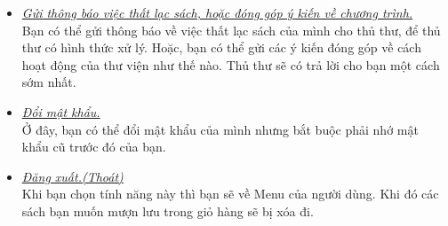 \documentclass[16pt,a4paper,oneside]{article}
\begin{document}
\begin{itemize}
	\item \underline{\textit{Gửi thông báo việc thất lạc sách, hoặc đóng góp ý kiến về chương trình.}}\\
	Bạn có thể gửi thông báo về việc thất lạc sách của mình cho thủ thư, để thủ thư có hình thức xử lý. Hoặc, bạn có thể gửi các ý kiến đóng góp về cách hoạt động của thư viện như thế nào. Thủ thư sẽ có trả lời cho bạn một cách sớm nhất.
	\item \underline{\textit{Đổi mật khẩu.}}\\
	Ở đây, bạn có thể đổi mật khẩu của mình nhưng bắt buộc phải nhớ mật khẩu cũ trước đó của bạn.
	\item \underline{\textit{Đăng xuất.(Thoát)}}\\
	Khi bạn chọn tính năng này thì bạn sẽ về Menu của người dùng. Khi đó các sách bạn muốn mượn lưu trong giỏ hàng sẽ bị xóa đi.
\end{itemize}
\end{document}
